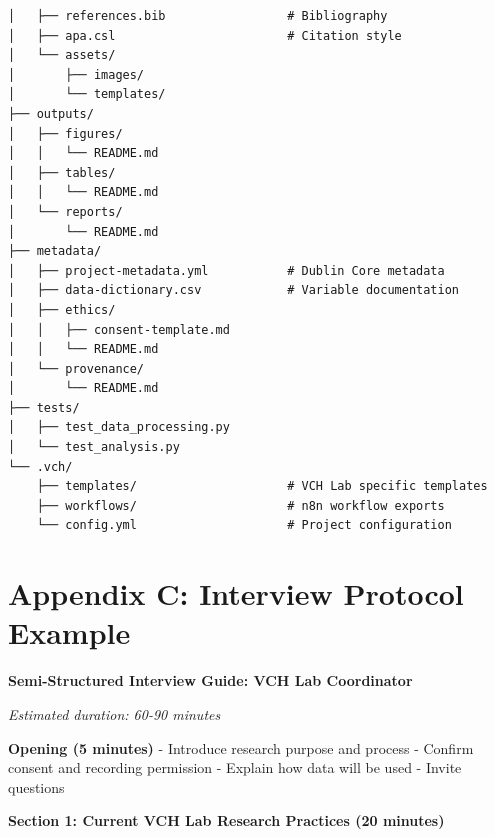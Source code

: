 \documentclass[
  oneside,
  open=any]{scrbook}
\begin{document}
\begin{verbatim}
│   ├── references.bib                 # Bibliography
│   ├── apa.csl                        # Citation style
│   └── assets/
│       ├── images/
│       └── templates/
├── outputs/
│   ├── figures/
│   │   └── README.md
│   ├── tables/
│   │   └── README.md
│   └── reports/
│       └── README.md
├── metadata/
│   ├── project-metadata.yml           # Dublin Core metadata
│   ├── data-dictionary.csv            # Variable documentation
│   ├── ethics/
│   │   ├── consent-template.md
│   │   └── README.md
│   └── provenance/
│       └── README.md
├── tests/
│   ├── test_data_processing.py
│   └── test_analysis.py
└── .vch/
    ├── templates/                     # VCH Lab specific templates
    ├── workflows/                     # n8n workflow exports
    └── config.yml                     # Project configuration
\end{verbatim}

\section{Appendix C: Interview Protocol
Example}\label{appendix-c-interview-protocol-example}

\textbf{Semi-Structured Interview Guide: VCH Lab Coordinator}

\emph{Estimated duration: 60-90 minutes}

\textbf{Opening (5 minutes)} - Introduce research purpose and process -
Confirm consent and recording permission - Explain how data will be used
- Invite questions

\textbf{Section 1: Current VCH Lab Research Practices (20 minutes)}
\end{document}
